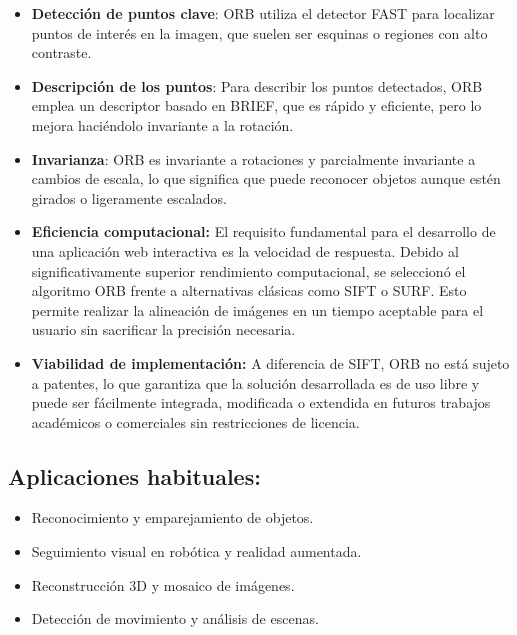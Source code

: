 \begin{itemize}
    \item \textbf{Detección de puntos clave}: ORB utiliza el detector FAST para localizar puntos de interés en la imagen, que suelen ser esquinas o regiones con alto contraste.
    \item \textbf{Descripción de los puntos}: Para describir los puntos detectados, ORB emplea un descriptor basado en BRIEF, que es rápido y eficiente, pero lo mejora haciéndolo invariante a la rotación.
    \item \textbf{Invarianza}: ORB es invariante a rotaciones y parcialmente invariante a cambios de escala, lo que significa que puede reconocer objetos aunque estén girados o ligeramente escalados.

    \item \textbf{Eficiencia computacional:} El requisito fundamental para el desarrollo de una aplicación web interactiva es la velocidad de respuesta. Debido al significativamente superior rendimiento computacional, se seleccionó el algoritmo ORB frente a alternativas clásicas como SIFT o SURF. Esto permite realizar la alineación de imágenes en un tiempo aceptable para el usuario sin sacrificar la precisión necesaria.

    \item \textbf{Viabilidad de implementación:} A diferencia de SIFT, ORB no está sujeto a patentes, lo que garantiza que la solución desarrollada es de uso libre y puede ser fácilmente integrada, modificada o extendida en futuros trabajos académicos o comerciales sin restricciones de licencia.
\end{itemize}


\subsection{Aplicaciones habituales:}

\begin{itemize}
    \item Reconocimiento y emparejamiento de objetos.
    \item Seguimiento visual en robótica y realidad aumentada.
    \item Reconstrucción 3D y mosaico de imágenes.
    \item Detección de movimiento y análisis de escenas.
\end{itemize}


